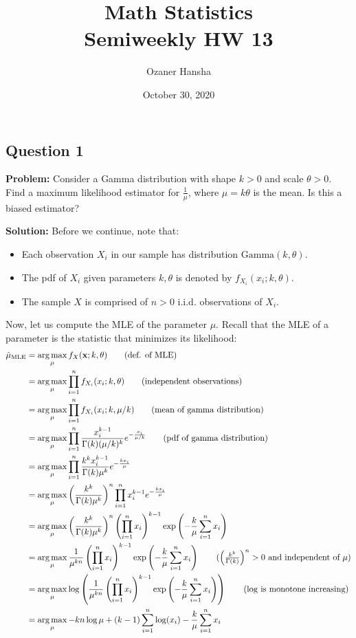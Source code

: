 \documentclass{article}
\renewcommand{\vec}[1]{\mathbf{#1}}
\DeclareMathOperator*{\argmax}{arg\,max}
\begin{document}
\title{Math Statistics\\ Semiweekly HW 13}
\author{Ozaner Hansha}
\date{October 30, 2020}
\maketitle

\subsection*{Question 1}
\noindent\textbf{Problem:} Consider a Gamma distribution with shape $k>0$ and scale $\theta>0$. Find a maximum likelihood estimator for $\frac{1}{\mu}$, where $\mu=k\theta$ is the mean. Is this a biased estimator?
\bigskip

\noindent\textbf{Solution:} Before we continue, note that:
\begin{itemize}
	\item Each observation $X_i$ in our sample has distribution $\text{Gamma}(k,\theta)$.
	\item The pdf of $X_i$ given parameters $k,\theta$ is denoted by $f_{X_i}(x_i;k,\theta)$.
	\item The sample $X$ is comprised of $n>0$ i.i.d. observations of $X_i$.
\end{itemize}

Now, let us compute the MLE of the parameter $\mu$. Recall that the MLE of a parameter is the statistic that minimizes its likelihood:
\begin{align*}
    \hat\mu_{\text{MLE}}&=\argmax_{\mu}f_X(\vec x;k,\theta)\tag{def. of MLE}\\
    &=\argmax_{\mu}\prod_{i=1}^nf_{X_i}(x_i;k,\theta)\tag{independent observations}\\
    &=\argmax_{\mu}\prod_{i=1}^nf_{X_i}(x_i;k,\mu/k)\tag{mean of gamma distribution}\\
    &=\argmax_{\mu}\prod_{i=1}^n\frac{x_i^{k-1}}{\Gamma(k)(\mu/k)^k}e^{-\frac{x_i}{\mu/k}}\tag{pdf of gamma distribution}\\
    &=\argmax_{\mu}\prod_{i=1}^n\frac{k^kx_i^{k-1}}{\Gamma(k)\mu^k}e^{-\frac{kx_i}{\mu}}\\
    &=\argmax_{\mu}\left(\frac{k^k}{\Gamma(k)\mu^k}\right)^n\prod_{i=1}^nx_i^{k-1}e^{-\frac{kx_i}{\mu}}\\
    &=\argmax_{\mu}\left(\frac{k^k}{\Gamma(k)\mu^k}\right)^n\left(\prod_{i=1}^nx_i\right)^{k-1}\exp\left(-\frac{k}{\mu}\sum_{i=1}^nx_i\right)\\
    &=\argmax_{\mu}\frac{1}{\mu^{kn}}\left(\prod_{i=1}^nx_i\right)^{k-1}\exp\left(-\frac{k}{\mu}\sum_{i=1}^nx_i\right)\tag{$\left(\frac{k^k}{\Gamma(k)}\right)^n>0$ and independent of $\mu$}\\
    &=\argmax_{\mu}\log\left(\frac{1}{\mu^{kn}}\left(\prod_{i=1}^nx_i\right)^{k-1}\exp\left(-\frac{k}{\mu}\sum_{i=1}^nx_i\right)\right)\tag{$\log$ is monotone increasing}\\
    &=\argmax_{\mu}-kn\log\mu+(k-1)\sum_{i=1}^n\log(x_i)-\frac{k}{\mu}\sum_{i=1}^nx_i\\
\end{align*}
\end{document}
